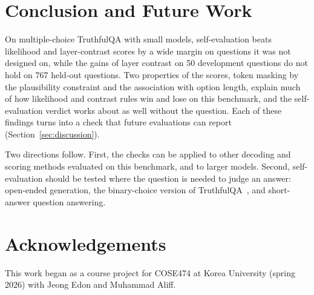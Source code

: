 \documentclass[11pt]{article}
\begin{document}
\section{Conclusion and Future Work}
\label{sec:conclusion}
On multiple-choice TruthfulQA with small models, self-evaluation beats likelihood and layer-contrast scores by a
wide margin on questions it was not designed on, while the gains of layer contrast on 50 development questions do
not hold on 767 held-out questions. Two properties of the scores, token masking by the plausibility constraint and
the association with option length, explain much of how likelihood and contrast rules win and lose on this
benchmark, and the self-evaluation verdict works about as well without the question. Each of these findings turns
into a check that future evaluations can report (Section~\ref{sec:discussion}).

Two directions follow. First, the checks can be applied to other decoding and scoring methods evaluated on this
benchmark, and to larger models. Second, self-evaluation should be tested where the question is needed to judge an
answer: open-ended generation, the binary-choice version of TruthfulQA~\citep{evans2025improved}, and short-answer
question answering.

\section*{Acknowledgements}
This work began as a course project for COSE474 at Korea University (spring 2026) with Jeong Edon and Muhammad
Aliff.




\appendix
\end{document}
